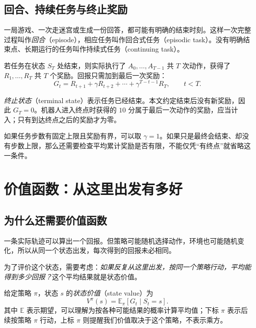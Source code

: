 \documentclass[UTF8,12pt,a4paper,fontset=fandol]{ctexart}
\begin{document}
\subsection{回合、持续任务与终止奖励}

一局游戏、一次走迷宫或生成一份回答，都可能有明确的结束时刻。这样一次完整过程叫作\emph{回合}（episode），相应任务叫作回合式任务（episodic task）。没有明确结束点、长期运行的任务叫作持续式任务（continuing task）。

若任务在状态 $S_T$ 处结束，则实际执行了 $A_0,\ldots,A_{T-1}$ 共 $T$ 次动作，获得了 $R_1,\ldots,R_T$ 共 $T$ 个奖励。回报只需加到最后一次奖励：
\begin{equation}
  G_t=R_{t+1}+\gamma R_{t+2}+\cdots+\gamma^{T-t-1}R_T,
  \qquad t<T.
  \label{eq:mdp-finite-return}
\end{equation}

\emph{终止状态}（terminal state）表示任务已经结束。本文约定结束后没有新奖励，因此 $G_T=0$。机器人进入终点时获得的 $10$ 分属于最后一次动作的奖励，应当计入；只有到达终点之后的奖励才为零。

如果任务步数有固定上限且奖励有界，可以取 $\gamma=1$。如果只是最终会结束、却没有步数上限，那么还需要检查平均累计奖励是否有限，不能仅凭“有终点”就省略这一条件。

\section{价值函数：从这里出发有多好}
\label{sec:mdp-value}

\subsection{为什么还需要价值函数}

一条实际轨迹可以算出一个回报。但策略可能随机选择动作，环境也可能随机变化，所以从同一个状态出发，每次得到的回报未必相同。

为了评价这个状态，需要考虑：\emph{如果反复从这里出发，按同一个策略行动，平均能得到多少回报？}这个平均结果就是状态价值。

\begin{definition}[状态价值函数]
给定策略 $\pi$，状态 $s$ 的\emph{状态价值}（state value）为
\begin{equation}
  V^\pi(s)=\mathbb E_\pi[G_t\mid S_t=s].
  \label{eq:mdp-state-value}
\end{equation}
其中 $\mathbb E$ 表示期望，可以理解为按各种可能结果的概率计算平均值；下标 $\pi$ 表示后续按策略 $\pi$ 行动，上标 $\pi$ 则提醒我们价值取决于这个策略，不表示乘方。
\end{definition}
\end{document}
